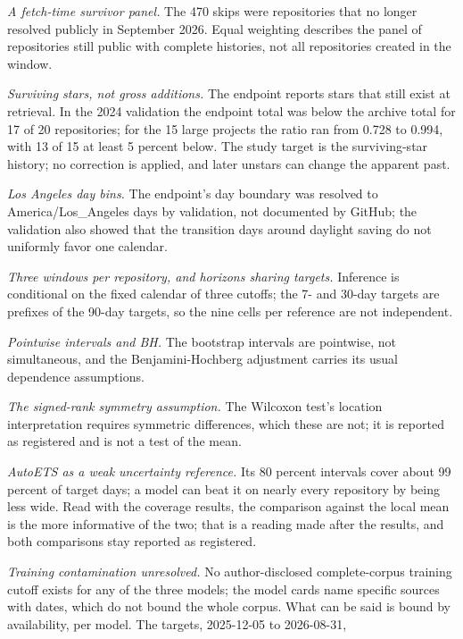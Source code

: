 \item \emph{A fetch-time survivor panel.} The 470 skips were repositories that no longer resolved publicly in
  September 2026. Equal weighting describes the panel of repositories still public with complete histories,
  not all repositories created in the window.
\item \emph{Surviving stars, not gross additions.} The endpoint reports stars that still exist at retrieval.
  In the 2024 validation the endpoint total was below the archive total for 17 of 20 repositories; for the
  15 large projects the ratio ran from 0.728 to 0.994, with 13 of 15 at least 5 percent below. The study
  target is the surviving-star history; no correction is applied, and later unstars can change the apparent
  past.
\item \emph{Los Angeles day bins.} The endpoint's day boundary was resolved to America/Los\_Angeles days by
  validation, not documented by GitHub; the validation also showed that the transition days around daylight
  saving do not uniformly favor one calendar.
\item \emph{Three windows per repository, and horizons sharing targets.} Inference is conditional on the
  fixed calendar of three cutoffs; the 7- and 30-day targets are prefixes of the 90-day targets, so the
  nine cells per reference are not independent.
\item \emph{Pointwise intervals and BH.} The bootstrap intervals are pointwise, not simultaneous, and the
  Benjamini-Hochberg adjustment carries its usual dependence assumptions.
\item \emph{The signed-rank symmetry assumption.} The Wilcoxon test's location interpretation requires
  symmetric differences, which these are not; it is reported as registered and is not a test of the mean.
\item \emph{AutoETS as a weak uncertainty reference.} Its 80 percent intervals cover about 99 percent of
  target days; a model can beat it on nearly every repository by being less wide. Read with the coverage
  results, the comparison against the local mean is the more informative of the two; that is a reading made
  after the results, and both comparisons stay reported as registered.
\item \emph{Training contamination unresolved.} No author-disclosed complete-corpus training cutoff exists
  for any of the three models; the model cards name specific sources with dates, which do not bound the
  whole corpus. What can be said is bound by availability, per model. The targets, 2025-12-05 to 2026-08-31,
